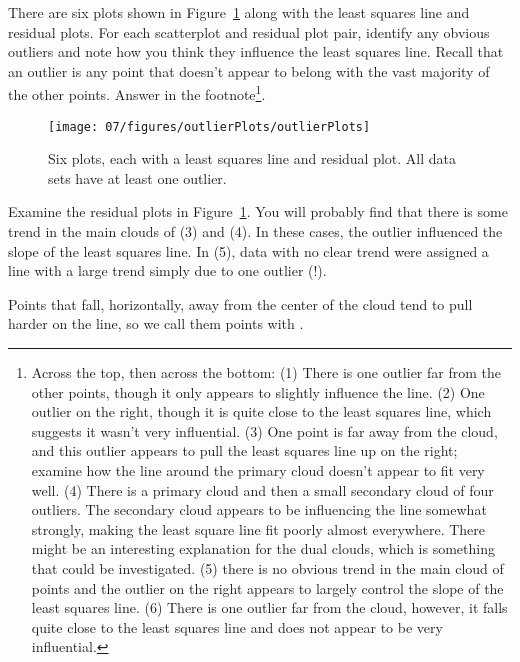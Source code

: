 \begin{exercise} \label{outlierPlotsExercise}
There are six plots shown in Figure~\ref{outlierPlots} along with the least squares line and residual plots. For each scatterplot and residual plot pair, identify any obvious outliers and note how you think they influence the least squares line. Recall that an outlier is any point that doesn't appear to belong with the vast majority of the other points. Answer in the footnote\footnote{Across the top, then across the bottom: (1) There is one outlier far from the other points, though it only appears to slightly influence the line. (2) One outlier on the right, though it is quite close to the least squares line, which suggests it wasn't very influential. (3) One point is far away from the cloud, and this outlier appears to pull the least squares line up on the right; examine how the line around the primary cloud doesn't appear to fit very well. (4) There is a primary cloud and then a small secondary cloud of four outliers. The secondary cloud appears to be influencing the line somewhat strongly, making the least square line fit poorly almost everywhere. There might be an interesting explanation for the dual clouds, which is something that could be investigated. (5) there is no obvious trend in the main cloud of points and the outlier on the right appears to largely control the slope of the least squares line. (6) There is one outlier far from the cloud, however, it falls quite close to the least squares line and does not appear to be very influential.}.
\end{exercise}
\begin{figure}
\centering
\texttt{[image: 07/figures/outlierPlots/outlierPlots]}
\caption{Six plots, each with a least squares line and residual plot. All data sets have at least one outlier.}
\label{outlierPlots}
\end{figure}

Examine the residual plots in Figure~\ref{outlierPlots}. You will probably find that there is some trend in the main clouds of (3) and (4). In these cases, the outlier influenced the slope of the least squares line. In (5), data with no clear trend were assigned a line with a large trend simply due to one outlier (!).
 
 \begin{termBox}{
Points that fall, horizontally, away from the center of the cloud tend to pull harder on the line, so we call them points with .}
\end{termBox}

